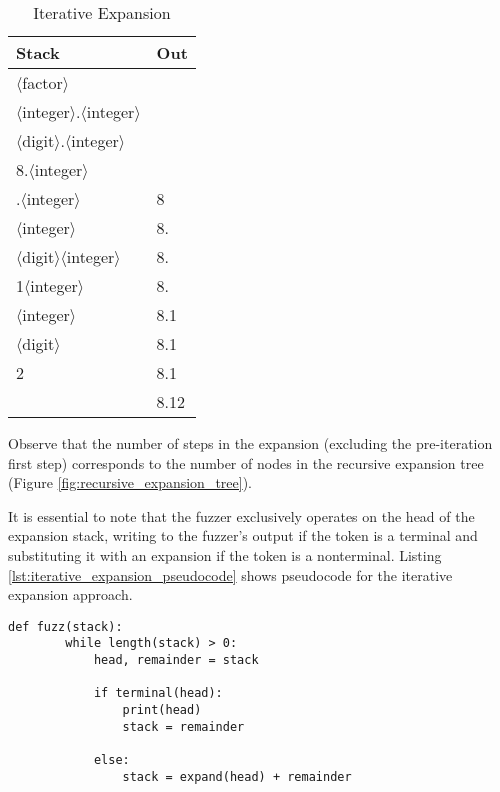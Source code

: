 \documentclass[8pt, twoside]{extarticle}
\begin{document}
\begin{table}[hbt!]
	\centering\small

	\begin{tabular}{ll}
		 Stack                                                & Out  \\
		 \hline %
		 $\langle$factor$\rangle$                             &      \\
		 $\langle$integer$\rangle$.$\langle$integer$\rangle$  &      \\
		 $\langle$digit$\rangle$.$\langle$integer$\rangle$    &      \\
		 8.$\langle$integer$\rangle$                          &      \\
		 .$\langle$integer$\rangle$                           & 8    \\
		 $\langle$integer$\rangle$                            & 8.   \\
		 $\langle$digit$\rangle$$\langle$integer$\rangle$     & 8.   \\
		 1$\langle$integer$\rangle$                           & 8.   \\
		 $\langle$integer$\rangle$                            & 8.1  \\
		 $\langle$digit$\rangle$                              & 8.1  \\
		 2                                                    & 8.1  \\
		                                                      & 8.12
	\end{tabular}

	\caption{Iterative Expansion}
	\label{tbl:iterative_expansion}
\end{table}

Observe that the number of steps in the expansion (excluding the pre-iteration first step) corresponds to the number of nodes in the recursive expansion tree (Figure \ref{fig:recursive_expansion_tree}).

It is essential to note that the fuzzer exclusively operates on the head of the expansion stack, writing to the fuzzer's output if the token is a terminal and substituting it with an expansion if the token is a nonterminal. Listing \ref{lst:iterative_expansion_pseudocode} shows pseudocode for the iterative expansion approach.

\begin{lstlisting}[gobble=2, caption={Iterative expansion pseudocode}, label=lst:iterative_expansion_pseudocode]
	def fuzz(stack):
		while length(stack) > 0:
			head, remainder = stack
			
			if terminal(head):
				print(head)
				stack = remainder

			else:
				stack = expand(head) + remainder
\end{lstlisting}
\end{document}
